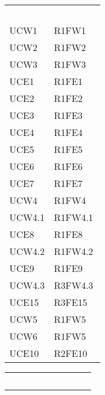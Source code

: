 \begin{table}[!htbp]
\renewcommand{\arraystretch}{1.5}
\begin{tabular}[t]{ m{}<{\centering}  m{}<{\centering} }
	\rowcolor{darkblue}
	\textcolor{white}{\textbf{Fonte}} &\textcolor{white}{\textbf{Requisiti}}\\ 

	UCW1 & R1FW1\\	
	 
	UCW2 & R1FW2\\	

	UCW3 & R1FW3\\	
	 
	UCE1 & R1FE1\\	
	 
	UCE2 & R1FE2\\	
	 
	UCE3 & R1FE3\\	

	UCE4 & R1FE4\\	
	
	UCE5 & R1FE5\\
	 
	UCE6 & R1FE6\\	 
	 
	UCE7 & R1FE7\\	

	UCW4 & R1FW4\\ 
	 
	UCW4.1 & R1FW4.1\\	
	 
	UCE8 & R1FE8 \\	
	 
	UCW4.2 & R1FW4.2\\		 

	UCE9 & R1FE9\\		
	 
	UCW4.3 & R3FW4.3 \\				
	 
	UCE15 & R3FE15\\			
	  	 	 	
	UCW5 & R1FW5\\		
	 
	UCW6 & R1FW5 \\
	
	UCE10 & R2FE10 \\

\end{tabular}
\begin{tabular}[t]{ m{}<{\centering}  m{}<{\centering} }
	\rowcolor{darkblue}
	\textcolor{white}{\textbf{Fonte}} &\textcolor{white}{\textbf{Requisiti}}\\ 


\end{tabular}
\end{table}
